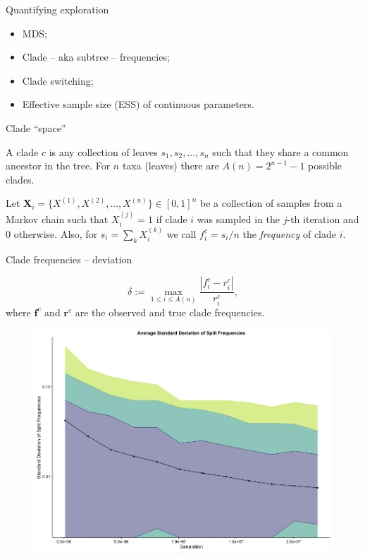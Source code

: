 \documentclass[newPxFont,numfooter,sectionpages]{beamer}
\begin{document}
\begin{frame}{Quantifying exploration}
\begin{itemize}
 \item MDS;
 \item Clade -- aka subtree -- frequencies;
 \item Clade switching;
 \item Effective sample size (ESS) of continuous parameters.
\end{itemize}
\end{frame}

\begin{frame}{Clade ``space''}

A clade $c$ is any collection of leaves $s_1, s_2, \ldots, s_n$ such that they share a common ancestor in the tree.
For $n$ taxa (leaves) there are $A(n) = 2^{n-1} -1$ possible clades. 

Let $\boldsymbol X_i = \{X^{(1)}, X^{(2)}, \ldots, X^{(n)}\} \in [0, 1]^n$ be a collection of samples from a Markov chain such that $X^{(j)}_i = 1$ if clade $i$ was sampled in the $j$-th iteration and $0$ otherwise.
Also, for $s_i = \sum_k X_i^{(k)}$ we call $f_i^c = s_i/n$ the \textit{frequency} of clade $i$.

\end{frame}

\begin{frame}{Clade frequencies -- deviation}

\[ \delta := \max_{1 \leq i \leq A(n)} \frac{|f^c_i - r^c_i|}{r^c_i}, \]
where $\boldsymbol f^c$ and $\boldsymbol r^c$ are the observed and true clade frequencies.

\begin{figure}
	\includegraphics[scale=0.25]{figures/asdsf.png} 
\end{figure}
\end{frame}
\end{document}
